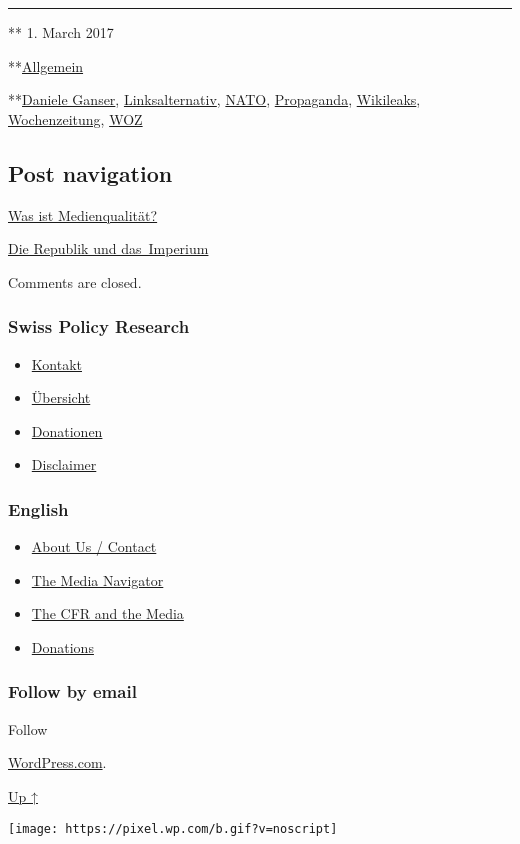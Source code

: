 \begin{center}\rule{0.5\linewidth}{\linethickness}\end{center}

** 1. March 2017

**\href{https://swprs.org/category/allgemein/}{Allgemein}

**\href{https://swprs.org/tag/daniele-ganser/}{Daniele Ganser},
\href{https://swprs.org/tag/linksalternativ/}{Linksalternativ},
\href{https://swprs.org/tag/nato/}{NATO},
\href{https://swprs.org/tag/propaganda/}{Propaganda},
\href{https://swprs.org/tag/wikileaks/}{Wikileaks},
\href{https://swprs.org/tag/wochenzeitung/}{Wochenzeitung},
\href{https://swprs.org/tag/woz/}{WOZ}

\hypertarget{post-navigation}{%
\subsection{Post navigation}\label{post-navigation}}

\href{https://swprs.org/2017/03/01/medienqualitaet/}{Was ist
Medienqualität?}

\href{https://swprs.org/2017/03/01/die-republik-und-das-imperium/}{Die
Republik und das~Imperium}

Comments are closed.

\hypertarget{swiss-policy-research}{%
\subsubsection{Swiss Policy Research}\label{swiss-policy-research}}

\begin{itemize}
\tightlist
\item
  \href{https://swprs.org/kontakt/}{Kontakt}
\item
  \href{https://swprs.org/uebersicht/}{Übersicht}
\item
  \href{https://swprs.org/donationen/}{Donationen}
\item
  \href{https://swprs.org/disclaimer/}{Disclaimer}
\end{itemize}

\hypertarget{english}{%
\subsubsection{English}\label{english}}

\begin{itemize}
\tightlist
\item
  \href{https://swprs.org/contact/}{About Us / Contact}
\item
  \href{https://swprs.org/media-navigator/}{The Media Navigator}
\item
  \href{https://swprs.org/the-american-empire-and-its-media/}{The CFR
  and the Media}
\item
  \href{https://swprs.org/donations/}{Donations}
\end{itemize}

\hypertarget{follow-by-email}{%
\subsubsection{Follow by email}\label{follow-by-email}}

Follow

\href{https://wordpress.com/?ref=footer_custom_com}{WordPress.com}.

\protect\hyperlink{}{Up ↑}

\texttt{[image: https://pixel.wp.com/b.gif?v=noscript]}
